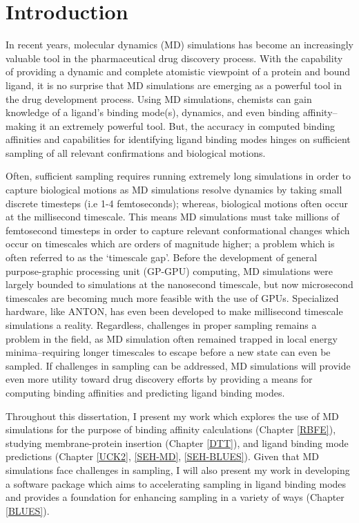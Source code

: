 \chapter*{Introduction} \label{introduction}

In recent years, molecular dynamics (MD) simulations has become an increasingly valuable tool in the pharmaceutical drug discovery process.
With the capability of providing a dynamic and complete atomistic viewpoint of a protein and bound ligand, it is no surprise that MD simulations are emerging as a powerful tool in the drug development process.
Using MD simulations, chemists can gain knowledge of a ligand's binding mode(s), dynamics, and even binding affinity--making it an extremely powerful tool.
But, the accuracy in computed binding affinities and capabilities for identifying ligand binding modes hinges on sufficient sampling of all relevant confirmations and biological motions. 

Often, sufficient sampling requires running extremely long simulations in order to capture biological motions as MD simulations resolve dynamics by taking small discrete timesteps (i.e 1-4 femtoseconds); whereas, biological motions often occur at the millisecond timescale.
This means MD simulations must take millions of femtosecond timesteps in order to capture relevant conformational changes which occur on timescales which are orders of magnitude higher; a problem which is often referred to as the `timescale gap'.
Before the development of general purpose-graphic processing unit (GP-GPU) computing, MD simulations were largely bounded to simulations at the nanosecond timescale, but now microsecond timescales are becoming much more feasible with the use of GPUs.
Specialized hardware, like ANTON, has even been developed to make millisecond timescale simulations a reality.
Regardless, challenges in proper sampling remains a problem in the field, as MD simulation often remained trapped in local energy minima--requiring longer timescales to escape before a new state can even be sampled.
If challenges in sampling can be addressed, MD simulations will provide even more utility toward drug discovery efforts by providing a means for computing binding affinities and predicting ligand binding modes.

Throughout this dissertation, I present my work which explores the use of MD simulations for the purpose of binding affinity calculations (Chapter \ref{RBFE}), studying membrane-protein insertion (Chapter \ref{DTT}), and ligand binding mode predictions (Chapter \ref{UCK2}, \ref{SEH-MD}, \ref{SEH-BLUES}).
Given that MD simulations face challenges in sampling, I will also present my work in developing a software package which aims to accelerating sampling in ligand binding modes and provides a foundation for enhancing sampling in a variety of ways (Chapter \ref{BLUES}).


